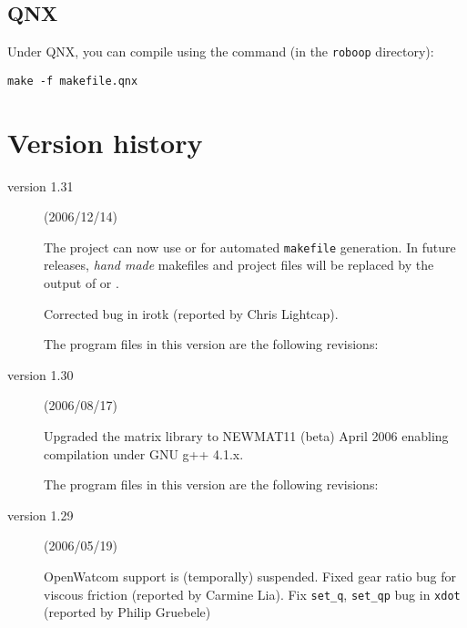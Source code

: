 \documentclass[dvips,11pt,fleqn]{report}
\begin{document}
\subsection{QNX}

Under \textsf{QNX}, you can compile using the command (in the
\texttt{roboop} directory):
\begin{verbatim}
make -f makefile.qnx
\end{verbatim}



\section{Version history}

\begin{description}

\item[version 1.31] (2006/12/14)
  
  The project can now use
   or
  for automated \texttt{makefile} generation. In future releases,
  \emph{hand made} makefiles and project files will be replaced by the
  output of 
  or
  .

  Corrected bug in irotk (reported by Chris Lightcap).
  
  The program files in this version are the following revisions:
{\small

}

\item[version 1.30] (2006/08/17)
  
  Upgraded the matrix library to \textsf{NEWMAT11 (beta) April 2006}
  enabling compilation under \textsf{GNU g++ 4.1.x}.
  
  The program files in this version are the following revisions:

\item[version 1.29] (2006/05/19)
  
  \textsf{OpenWatcom} support is (temporally) suspended. Fixed gear
  ratio bug for viscous friction (reported by Carmine Lia). Fix
  \texttt{set\_q}, \texttt{set\_qp} bug in \texttt{xdot} (reported by
  Philip Gruebele)


\end{description}
\end{document}
